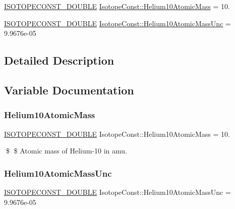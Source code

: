 \begin{DoxyCompactItemize}
\item 
\mbox{\hyperlink{group___isotope_const-_macros_ga8f45a7272ce02c0b4c65c44636ed719a}{I\+S\+O\+T\+O\+P\+E\+C\+O\+N\+S\+T\+\_\+\+D\+O\+U\+B\+LE}} \mbox{\hyperlink{group___isotope_const-_helium-_he10_ga77c06e27260d000423c099dde3405a9f}{Isotope\+Const\+::\+Helium10\+Atomic\+Mass}} = 10.
\item 
\mbox{\hyperlink{group___isotope_const-_macros_ga8f45a7272ce02c0b4c65c44636ed719a}{I\+S\+O\+T\+O\+P\+E\+C\+O\+N\+S\+T\+\_\+\+D\+O\+U\+B\+LE}} \mbox{\hyperlink{group___isotope_const-_helium-_he10_ga567a66d6da0ec64ef536c39dcdbd0120}{Isotope\+Const\+::\+Helium10\+Atomic\+Mass\+Unc}} = 9.\+9676e-\/05
\end{DoxyCompactItemize}


\subsection{Detailed Description}


\subsection{Variable Documentation}
\mbox{\label{group___isotope_const-_helium-_he10_ga77c06e27260d000423c099dde3405a9f}} 
\subsubsection{\texorpdfstring{Helium10\+Atomic\+Mass}{Helium10AtomicMass}}
{\footnotesize\ttfamily \mbox{\hyperlink{group___isotope_const-_macros_ga8f45a7272ce02c0b4c65c44636ed719a}{I\+S\+O\+T\+O\+P\+E\+C\+O\+N\+S\+T\+\_\+\+D\+O\+U\+B\+LE}} Isotope\+Const\+::\+Helium10\+Atomic\+Mass = 10.}

\$ \$ Atomic mass of Helium-\/10 in amu. \mbox{\label{group___isotope_const-_helium-_he10_ga567a66d6da0ec64ef536c39dcdbd0120}} 
\subsubsection{\texorpdfstring{Helium10\+Atomic\+Mass\+Unc}{Helium10AtomicMassUnc}}
{\footnotesize\ttfamily \mbox{\hyperlink{group___isotope_const-_macros_ga8f45a7272ce02c0b4c65c44636ed719a}{I\+S\+O\+T\+O\+P\+E\+C\+O\+N\+S\+T\+\_\+\+D\+O\+U\+B\+LE}} Isotope\+Const\+::\+Helium10\+Atomic\+Mass\+Unc = 9.\+9676e-\/05}

